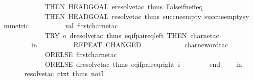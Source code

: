 \begin{isabellebody}
\ \ \ \ \ \ \ \ \ \ \ \ THEN\ HEADGOAL\ {\isacharparenleft}{\kern0pt}eresolve{}{\isacharunderscore}{\kern0pt}tac\ {\isacharat}{\kern0pt}{\isacharbraceleft}{\kern0pt}thms\ False{\isacharunderscore}{\kern0pt}if{\isacharunderscore}{\kern0pt}ne{\isacharunderscore}{\kern0pt}if{\isacharunderscore}{\kern0pt}eq{\isacharbraceright}{\kern0pt}{\isacharparenright}{\kern0pt}\isanewline
\ \ \ \ \ \ \ \ \ \ \ \ THEN\ HEADGOAL\ {\isacharparenleft}{\kern0pt}resolve{}{\isacharunderscore}{\kern0pt}tac\ {\isacharat}{\kern0pt}{\isacharbraceleft}{\kern0pt}thms\ succ{\isacharunderscore}{\kern0pt}ne{\isacharunderscore}{\kern0pt}empty\ succ{\isacharunderscore}{\kern0pt}ne{\isacharunderscore}{\kern0pt}empty{\isacharbrackleft}{\kern0pt}symmetric{\isacharbrackright}{\kern0pt}{\isacharbraceright}{\kern0pt}{\isacharparenright}{\kern0pt}{\isacharparenright}{\kern0pt}\isanewline
\isanewline
\ \ \ \ \ \ \ \ \ \ val\ first{\isacharunderscore}{\kern0pt}char{\isacharunderscore}{\kern0pt}ne{\isacharunderscore}{\kern0pt}tac\ {\isacharequal}{\kern0pt}\isanewline
\ \ \ \ \ \ \ \ \ \ \ \ TRY\ o\ dresolve{}{\isacharunderscore}{\kern0pt}tac\ {\isacharat}{\kern0pt}{\isacharbraceleft}{\kern0pt}thms\ eq{\isacharunderscore}{\kern0pt}if{\isacharunderscore}{\kern0pt}pair{\isacharunderscore}{\kern0pt}eq{\isacharunderscore}{\kern0pt}left{\isacharbraceright}{\kern0pt}\ THEN{\isacharprime}{\kern0pt}\ char{\isacharunderscore}{\kern0pt}ne{\isacharunderscore}{\kern0pt}tac\isanewline
\ \ \ \ \ \ \ \ in\isanewline
\ \ \ \ \ \ \ \ \ \ REPEAT\ {\isacharparenleft}{\kern0pt}CHANGED\isanewline
\ \ \ \ \ \ \ \ \ \ \ \ {\isacharparenleft}{\kern0pt}{\isacharparenleft}{\kern0pt}char{\isacharunderscore}{\kern0pt}ne{\isacharunderscore}{\kern0pt}word{\isacharunderscore}{\kern0pt}tac\isanewline
\ \ \ \ \ \ \ \ \ \ \ \ ORELSE{\isacharprime}{\kern0pt}\ first{\isacharunderscore}{\kern0pt}char{\isacharunderscore}{\kern0pt}ne{\isacharunderscore}{\kern0pt}tac\isanewline
\ \ \ \ \ \ \ \ \ \ \ \ ORELSE{\isacharprime}{\kern0pt}\ dresolve{}{\isacharunderscore}{\kern0pt}tac\ {\isacharat}{\kern0pt}{\isacharbraceleft}{\kern0pt}thms\ eq{\isacharunderscore}{\kern0pt}if{\isacharunderscore}{\kern0pt}pair{\isacharunderscore}{\kern0pt}eq{\isacharunderscore}{\kern0pt}right{\isacharbraceright}{\kern0pt}{\isacharparenright}{\kern0pt}\ i{\isacharparenright}{\kern0pt}{\isacharparenright}{\kern0pt}\isanewline
\ \ \ \ \ \ \ \ end\isanewline
\ \ \ \ in\isanewline
\ \ \ \ \ \ resolve{\isacharunderscore}{\kern0pt}tac\ ctxt\ {\isacharat}{\kern0pt}{\isacharbraceleft}{\kern0pt}thms\ notI{\isacharbraceright}{\kern0pt}\isanewline

\end{isabellebody}
